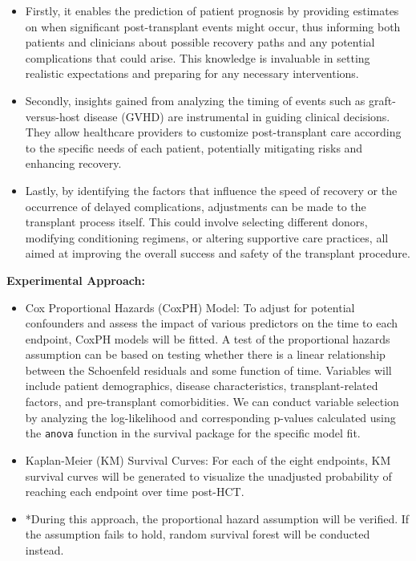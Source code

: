 \documentclass[11pt,]{article}
\providecommand{\tightlist}{%
  \setlength{\itemsep}{0pt}\setlength{\parskip}{0pt}}
\begin{document}
\begin{itemize}
\item
  Firstly, it enables the prediction of patient prognosis by providing
  estimates on when significant post-transplant events might occur, thus
  informing both patients and clinicians about possible recovery paths
  and any potential complications that could arise. This knowledge is
  invaluable in setting realistic expectations and preparing for any
  necessary interventions.
\item
  Secondly, insights gained from analyzing the timing of events such as
  graft-versus-host disease (GVHD) are instrumental in guiding clinical
  decisions. They allow healthcare providers to customize
  post-transplant care according to the specific needs of each patient,
  potentially mitigating risks and enhancing recovery.
\item
  Lastly, by identifying the factors that influence the speed of
  recovery or the occurrence of delayed complications, adjustments can
  be made to the transplant process itself. This could involve selecting
  different donors, modifying conditioning regimens, or altering
  supportive care practices, all aimed at improving the overall success
  and safety of the transplant procedure.
\end{itemize}

\textbf{Experimental Approach:}

\begin{itemize}
\tightlist
\item
  Cox Proportional Hazards (CoxPH) Model: To adjust for potential
  confounders and assess the impact of various predictors on the time to
  each endpoint, CoxPH models will be fitted. A test of the proportional
  hazards assumption can be based on testing whether there is a linear
  relationship between the Schoenfeld residuals and some function of
  time. Variables will include patient demographics, disease
  characteristics, transplant-related factors, and pre-transplant
  comorbidities. We can conduct variable selection by analyzing the
  log-likelihood and corresponding p-values calculated using the
  \texttt{anova} function in the survival package for the specific model
  fit.\\
\item
  Kaplan-Meier (KM) Survival Curves: For each of the eight endpoints, KM
  survival curves will be generated to visualize the unadjusted
  probability of reaching each endpoint over time post-HCT.
\item
  *During this approach, the proportional hazard assumption will be
  verified. If the assumption fails to hold, random survival forest will
  be conducted instead.
\end{itemize}
\end{document}
